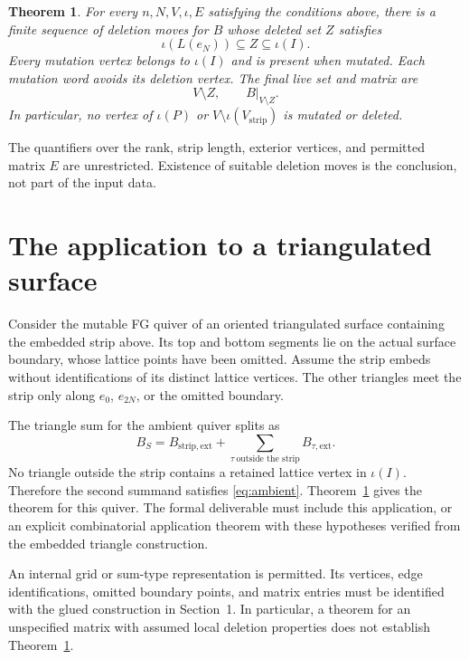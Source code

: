 \documentclass[11pt,a4paper]{article}
\newtheorem{theorem}{Theorem}
\newcommand{\strip}{\mathrm{strip}}
\begin{document}
\begin{theorem}\label{thm:target}
For every $n,N,V,\iota,E$ satisfying the conditions above, there is a finite
sequence of deletion moves for $B$ whose deleted set $Z$ satisfies
\[
 \iota(L(e_N))\subseteq Z\subseteq\iota(I).
\]
Every mutation vertex belongs to $\iota(I)$ and is present when mutated.
Each mutation word avoids its deletion vertex. The final live set and matrix are
\[
 V\setminus Z,\qquad B|_{V\setminus Z}.
\]
In particular, no vertex of $\iota(P)$ or $V\setminus\iota(V_{\strip})$
is mutated or deleted.
\end{theorem}

The quantifiers over the rank, strip length, exterior vertices, and permitted
matrix $E$ are unrestricted. Existence of suitable deletion moves is the
conclusion, not part of the input data.

\newpage
\section{The application to a triangulated surface}
Consider the mutable FG quiver of an oriented triangulated surface containing
the embedded strip above. Its top and bottom segments lie on the actual
surface boundary, whose lattice points have been omitted. Assume the strip
embeds without identifications of its distinct lattice vertices. The other
triangles meet the strip only along $e_0$, $e_{2N}$, or the omitted boundary.

The triangle sum for the ambient quiver splits as
\[
 B_S=B_{\strip,\mathrm{ext}}+
       \sum_{\tau\ \text{outside the strip}}B_{\tau,\mathrm{ext}}.
\]
No triangle outside the strip contains a retained lattice vertex in
$\iota(I)$. Therefore the second summand satisfies \eqref{eq:ambient}.
Theorem~\ref{thm:target} gives the theorem for this quiver.
The formal deliverable must include this application, or an explicit
combinatorial application theorem with these hypotheses verified from
the embedded triangle construction.

An internal grid or sum-type representation is permitted. Its vertices,
edge identifications, omitted boundary points, and matrix entries must be
identified with the glued construction in Section~1. In particular, a theorem
for an unspecified matrix with assumed local deletion properties does not
establish Theorem~\ref{thm:target}.
\end{document}
